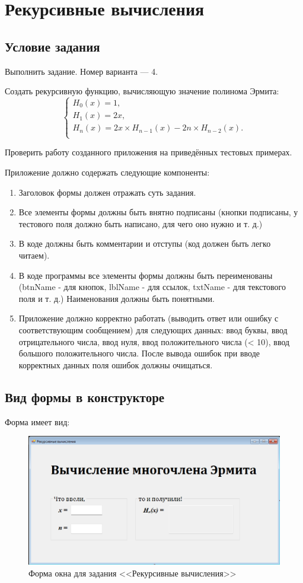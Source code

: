 \section{Рекурсивные вычисления}
\subsection{Условие задания}
Выполнить задание. Номер варианта --- 4.

Создать рекурсивную функцию, вычисляющую значение полинома Эрмита:
\begin{equation}
\begin{cases}
     H_0(x) = 1,\\
     H_1(x) = 2x,\\
     H_n(x) = 2x \times H_{n-1}(x) - 2n \times H_{n-2}(x).\\
\end{cases}
\end{equation}

Проверить работу созданного приложения на приведённых тестовых примерах. 

Приложение должно содержать следующие компоненты:
\begin{enumerate}
\item Заголовок формы должен отражать суть задания.
\item Все элементы формы должны быть внятно подписаны (кнопки подписаны, у тестового поля должно быть написано, для чего оно нужно и т. д.)
\item В коде должны быть комментарии и отступы (код должен быть легко читаем).
\item В коде программы все элементы формы должны быть переименованы (btnName -  для кнопок, lblName - для ссылок, txtName - для текстового поля и т. д.) Наименования должны быть понятными.
\item Приложение должно корректно работать (выводить ответ или ошибку с соответствующим сообщением) для следующих данных: ввод буквы, ввод отрицательного числа, ввод нуля, ввод положительного числа (< 10), ввод большого положительного числа. После вывода ошибок при вводе корректных данных поля ошибок должны очищаться.
\end{enumerate}

\subsection{Вид формы в конструкторе}
Форма имеет вид:

\begin{figure}
\centering
\includegraphics[width=0.5\linewidth]{images/recursive-calculations/form.png}
\caption{Форма окна для задания <<Рекурсивные вычисления>>}
\label{recursive-calculations-form}
\end{figure}

